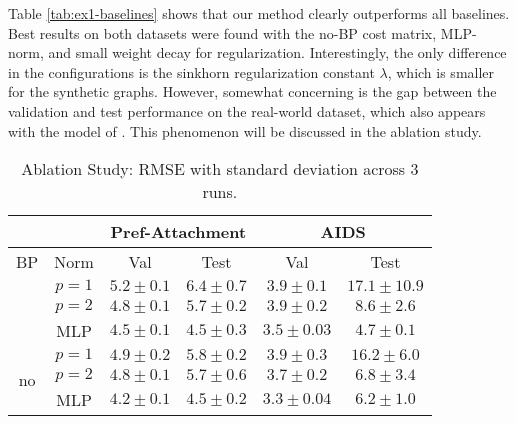 Table \ref{tab:ex1-baselines} shows that our method clearly outperforms all baselines. Best results on both datasets were found with the no-BP cost matrix, MLP-norm, and small weight decay for regularization. Interestingly, the only difference in the configurations is the  sinkhorn regularization constant $\lambda$, which is smaller for the synthetic graphs. However, somewhat concerning is the gap between the validation and test performance on the real-world dataset, which also appears with the model of \cite{bai2019}. This phenomenon will be discussed in the ablation study.


\begin{table}[htbp]
    \addtolength{\tabcolsep}{-1pt}
    \fontsize{9pt}{10.25pt}\selectfont
    \centering
    \renewcommand{\arraystretch}{1.2}
    \begin{tabular}{|c|c|c|c|c|c|}
        \hline
        \multicolumn{2}{|c|}{} & \multicolumn{2}{c|}{Pref-Attachment} & \multicolumn{2}{c|}{AIDS} \\ \hline
        BP & Norm & Val & Test & Val & Test \\ \hhline{|=|=|=|=|=|=|}
        \multirow{3}{*}{yes} & $p=1$ & $5.2 \pm 0.1$ & $6.4 \pm 0.7$ & $3.9 \pm 0.1$ & $17.1 \pm 10.9$ \\ \hhline{|~|-|-|-|-|-|}
        & $p=2$ & $4.8 \pm 0.1$ & $5.7 \pm 0.2$ & $3.9 \pm 0.2$ & $8.6 \pm 2.6$ \\ \hhline{|~|-|-|-|-|-|}
        & MLP & $4.5 \pm 0.1$ & $\boldsymbol{4.5 \pm 0.3}$ & $3.5 \pm 0.03$ & $\boldsymbol{4.7 \pm 0.1}$ \\ \hline
        \multirow{3}{*}{no}  & $p=1$ & $4.9 \pm 0.2$ & $5.8 \pm 0.2$ & $3.9 \pm 0.3$ & $16.2 \pm 6.0$ \\ \hhline{|~|-|-|-|-|-|}
        & $p=2$ & $4.8 \pm 0.1$ & $5.7 \pm 0.6$ & $3.7 \pm 0.2$ & $6.8 \pm 3.4$ \\ \hhline{|~|-|-|-|-|-|}
        & MLP & $4.2 \pm 0.1$ & $\boldsymbol{4.5 \pm 0.2}$ & $3.3 \pm 0.04$ & $6.2 \pm 1.0$ \\ \hline
    \end{tabular}
    \caption{Ablation Study: RMSE with standard deviation across 3 runs.}
    \label{tab:ex1-ablation}
\end{table}

